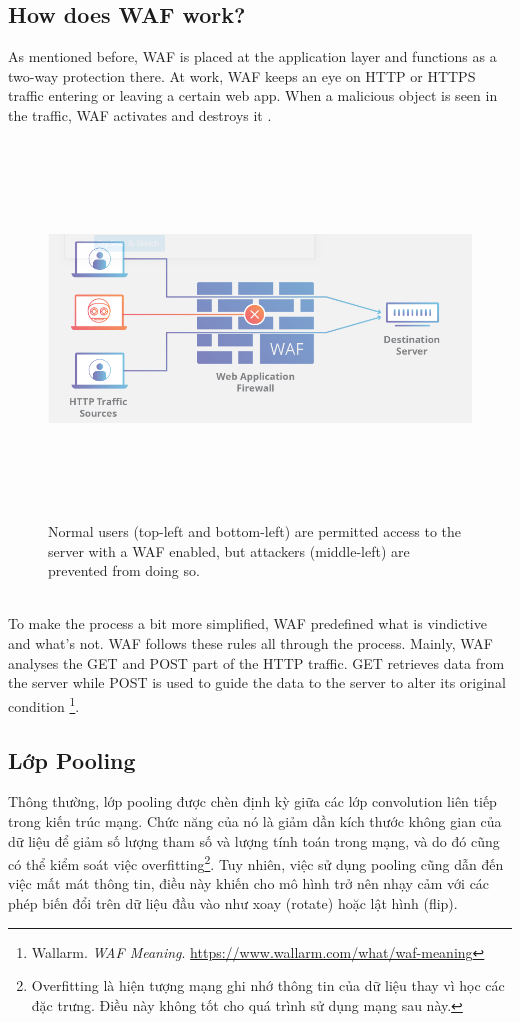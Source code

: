 \subsection{How does WAF work?}
\label{subsec:waf_work}
As mentioned before, WAF is placed at the application layer and functions as a two-way protection there. At work, WAF keeps an eye on HTTP or HTTPS traffic entering or leaving a certain web app. When a malicious object is seen in the traffic, WAF activates and destroys it . \\
\begin{figure}[!h]
   
	\centering
	\includegraphics[width=\linewidth, height=10cm,keepaspectratio]{figures/WAF.JPG}
	\caption{Normal users (top-left and bottom-left) are permitted access to the server with a WAF enabled, but attackers (middle-left) are prevented from doing so.}\label{Fig:Data1}
  
\end{figure}
\\
To make the process a bit more simplified, WAF predefined what is vindictive and what’s not. WAF follows these rules all through the process. Mainly, WAF analyses the GET and POST part of the HTTP traffic. GET retrieves data from the server while POST is used to guide the data to the server to alter its original condition \footnote{Wallarm. \textit{WAF Meaning}. \url{https://www.wallarm.com/what/waf-meaning}}.

\subsection{Lớp Pooling}
\label{subsec:lop_pooling}
	Thông thường, lớp pooling được chèn định kỳ giữa các lớp convolution liên tiếp trong kiến trúc mạng. Chức năng của nó là giảm dần kích thước không gian của dữ liệu để giảm số lượng tham số và lượng tính toán trong mạng, và do đó cũng có thể kiểm soát việc overfitting\footnote{Overfitting là hiện tượng mạng ghi nhớ thông tin của dữ liệu thay vì học các đặc trưng. Điều này không tốt cho quá trình sử dụng mạng sau này.}. Tuy nhiên, việc sử dụng pooling cũng dẫn đến việc mất mát thông tin, điều này khiến cho mô hình trở nên nhạy cảm với các phép biến đổi trên dữ liệu đầu vào như xoay (rotate) hoặc lật hình (flip). 
	
